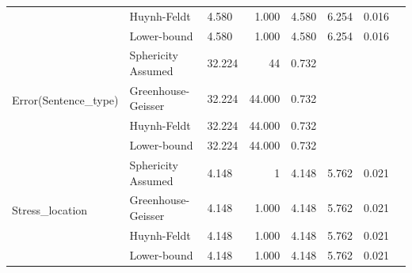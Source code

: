 \documentclass[a4paper]{article}
\begin{document}
\begin{table}[H]
\begin{center}
\begin{tabular}{p{}p{}|l|r|r|r|r|r|}
\cline{2-7}
                                                        & Huynh-Feldt        & 4.580                             & 1.000                   & 4.580                            & 6.254                  & 0.016                      \\ 
\cline{2-7}
                                                        & Lower-bound        & 4.580                             & 1.000                   & 4.580                            & 6.254                  & 0.016                      \\ 
\hline
\multirow{4}{*}{Error(Sentence\_type)}                  & Sphericity Assumed & 32.224                            & 44                      & 0.732                            & \multicolumn{1}{l|}{~} & \multicolumn{1}{l|}{~}     \\ 
\cline{2-7}
                                                        & Greenhouse-Geisser & 32.224                            & 44.000                  & 0.732                            & \multicolumn{1}{l|}{~} & \multicolumn{1}{l|}{~}     \\ 
\cline{2-7}
                                                        & Huynh-Feldt        & 32.224                            & 44.000                  & 0.732                            & \multicolumn{1}{l|}{~} & \multicolumn{1}{l|}{~}     \\ 
\cline{2-7}
                                                        & Lower-bound        & 32.224                            & 44.000                  & 0.732                            & \multicolumn{1}{l|}{~} & \multicolumn{1}{l|}{~}     \\ 
\hline
\multirow{4}{*}{Stress\_location}                       & Sphericity Assumed & 4.148                             & 1                       & 4.148                            & 5.762                  & 0.021                      \\ 
\cline{2-7}
                                                        & Greenhouse-Geisser & 4.148                             & 1.000                   & 4.148                            & 5.762                  & 0.021                      \\ 
\cline{2-7}
                                                        & Huynh-Feldt        & 4.148                             & 1.000                   & 4.148                            & 5.762                  & 0.021                      \\ 
\cline{2-7}
                                                        & Lower-bound        & 4.148                             & 1.000                   & 4.148                            & 5.762                  & 0.021                      \\ 

\end{tabular}
\end{center}
\end{table}
\end{document}
